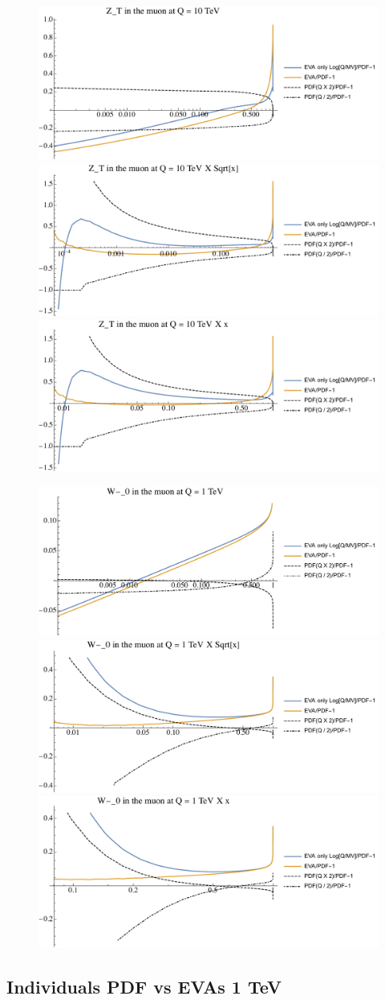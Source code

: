 \documentclass[a4paper,11pt]{article}
\begin{document}
\begin{figure}[ht]
\includegraphics[width=0.4\linewidth]{PlotPDFs/ratios/10TeV/Z_T_Q.pdf}
\includegraphics[width=0.4\linewidth]{PlotPDFs/ratios/10TeV/Z_T_Qsqrtx.pdf}
\includegraphics[width=0.4\linewidth]{PlotPDFs/ratios/10TeV/Z_T_Qx.pdf}
\end{figure}

\begin{figure}[ht]
\includegraphics[width=0.4\linewidth]{PlotPDFs/ratios/1TeV/W-_0_Q.pdf}
\includegraphics[width=0.4\linewidth]{PlotPDFs/ratios/1TeV/W-_0_Qsqrtx.pdf}
\includegraphics[width=0.4\linewidth]{PlotPDFs/ratios/1TeV/W-_0_Qx.pdf}
\end{figure}

\clearpage
\subsection{Individuals PDF vs EVAs 1 TeV}
\end{document}
